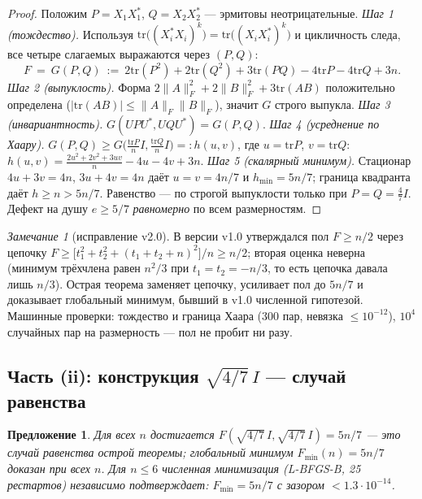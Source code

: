 \documentclass[11pt,a4paper]{article}
\theoremstyle{plain}
\newtheorem{proposition}[theorem]{Предложение}
\theoremstyle{definition}
\theoremstyle{remark}
\newtheorem{remark}[theorem]{Замечание}
\begin{document}
\begin{proof}
Положим $P=X_1X_1^*$, $Q=X_2X_2^*$ --- эрмитовы неотрицательные.
\emph{Шаг 1 (тождество).} Используя $\mathrm{tr}\bigl((X_i^*X_i)^k\bigr)=
\mathrm{tr}\bigl((X_iX_i^*)^k\bigr)$ и цикличность следа, все четыре слагаемых
выражаются через $(P,Q)$:
\begin{equation}
  F\ =\ G(P,Q)\ :=\ 2\mathrm{tr}(P^2)+2\mathrm{tr}(Q^2)+3\mathrm{tr}(PQ)
  -4\mathrm{tr}P-4\mathrm{tr}Q+3n.
\end{equation}
\emph{Шаг 2 (выпуклость).} Форма $2\|A\|_F^2+2\|B\|_F^2+3\mathrm{tr}(AB)$
положительно определена ($|\mathrm{tr}(AB)|\le\|A\|_F\|B\|_F$), значит $G$
строго выпукла. \emph{Шаг 3 (инвариантность).} $G(UPU^*,UQU^*)=G(P,Q)$.
\emph{Шаг 4 (усреднение по Хаару).} $G(P,Q)\ge
G\bigl(\frac{\mathrm{tr}P}{n}I,\frac{\mathrm{tr}Q}{n}I\bigr) =: h(u,v)$,
где $u=\mathrm{tr}P$, $v=\mathrm{tr}Q$:
$h(u,v)=\frac{2u^2+2v^2+3uv}{n}-4u-4v+3n$.
\emph{Шаг 5 (скалярный минимум).} Стационар $4u+3v=4n$, $3u+4v=4n$ даёт
$u=v=4n/7$ и $h_{\min}=5n/7$; граница квадранта даёт $h\ge n>5n/7$.
Равенство — по строгой выпуклости только при $P=Q=\frac47I$.
Дефект на душу $e\ge5/7$ \emph{равномерно} по всем размерностям.
\end{proof}

\begin{remark}[исправление v2.0]
В версии v1.0 утверждался пол $F\ge n/2$ через цепочку
$F\ge\bigl[t_1^2+t_2^2+(t_1+t_2+n)^2\bigr]/n\ge n/2$; вторая оценка неверна
(минимум трёхчлена равен $n^2/3$ при $t_1=t_2=-n/3$, то есть цепочка давала
лишь $n/3$). Острая теорема заменяет цепочку, усиливает пол до $5n/7$ и
доказывает глобальный минимум, бывший в v1.0 численной гипотезой.
Машинные проверки: тождество и граница Хаара (300 пар, невязка $\le10^{-12}$),
$10^4$ случайных пар на размерность — пол не пробит ни разу.
\end{remark}

\subsection{Часть (ii): конструкция $\sqrt{4/7}\,I$ --- случай равенства}

\begin{proposition}\label{prop:sharp}
Для всех $n$ достигается $F(\sqrt{4/7}\,I,\sqrt{4/7}\,I)=5n/7$ --- это
случай равенства острой теоремы; глобальный минимум $F_{\min}(n)=5n/7$
доказан при всех $n$. Для $n\le6$ численная минимизация (L-BFGS-B,
25 рестартов) независимо подтверждает: $F_{\min}=5n/7$ с зазором
$<1.3\cdot10^{-14}$.
\end{proposition}
\end{document}
